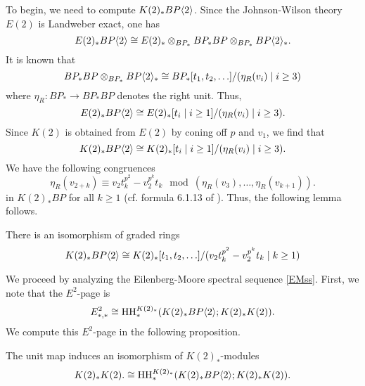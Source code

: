 To begin, we need to compute $K(2)_*BP\langle 2 \rangle$. 
Since the Johnson-Wilson theory $E(2)$ is Landweber exact, one has 
\[
E(2)_*BP\langle 2 \rangle\cong E(2)_*\otimes_{BP_*}BP_*BP\otimes_{BP_*}BP\langle 2 \rangle_*.
\]
It is known that 
\[
BP_*BP\otimes_{BP_*}BP\langle 2 \rangle_*\cong BP_*[t_1, t_2, \ldots]/(\eta_R(v_i)\mid i\geq 3)
\]
where $\eta_R:BP_*\to BP_*BP$ denotes the right unit. Thus, 
\[
E(2)_*BP\langle 2 \rangle  \cong E(2)_*[t_i\mid i\ge 1]/(\eta_R(v_i)\mid i\geq 3).
\]
Since $K(2)$ is obtained from $E(2)$ by coning off $p$ and $v_1$, we find that 
\[
K(2)_*BP\langle 2 \rangle\cong K(2)_*[t_i\mid i\ge 1]/(\eta_R(v_i)\mid i\geq 3).
\]
We have the following congruences
\[
\eta_R(v_{2+k})\equiv v_2t_k^{p^2}-v_2^{p^{k}}t_k \mod (\eta_R(v_{3}), \ldots , \eta_R(v_{k+1})).
\]
in $K(2)_*BP$ for all $k\geq 1$ (cf. formula 6.1.13 of \cite{greenbook}). Thus, the following lemma follows.
\begin{lem}
	There is an isomorphism of graded rings
	\begin{equation}
	K(2)_*BP\langle 2 \rangle\cong K(2)_*[t_1, t_2, \ldots ]/(v_2t_k^{p^2}-v_2^{p^k}t_k\mid k\geq 1)
	\end{equation}
\end{lem}

We proceed by analyzing the Eilenberg-Moore spectral sequence \eqref{EMss}. First, we note that the $E^2$-page is
\[
E^2_{*,*}\cong \operatorname{HH}_*^{K(2)_*}(K(2)_*BP\langle 2 \rangle;K(2)_*K(2)).
\]
We compute this $E^2$-page in the following proposition. 

\begin{thm}\label{thm: HH of K(2)R}
	The unit map induces an isomorphism of $K(2)_*$-modules
	\[
	K(2)_*K(2). \cong \operatorname{HH}^{K(2)_*}_*(K(2)_*BP\langle 2 \rangle;K(2)_*K(2)).
	\]
\end{thm}

